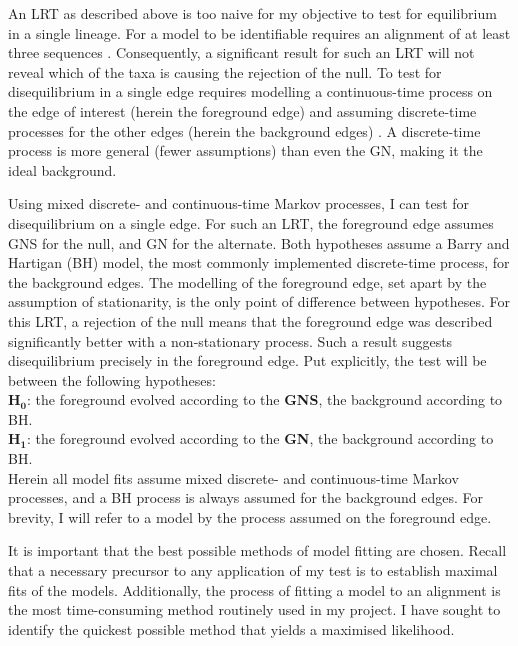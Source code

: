 An LRT as described above is too naive for my objective to test for equilibrium in a single lineage. For a model to be \gls{identifiable} requires an alignment of at least three sequences \cite{Chang1996FullConsistency}. Consequently, a significant result for such an LRT will not reveal which of the taxa is causing the rejection of the null. To test for disequilibrium in a single \gls{edge} requires  modelling a continuous-time process on the edge of interest (herein the foreground edge) and assuming discrete-time processes for the other edges (herein the background edges) \cite{Verbyla2013TheSubstitution}. A discrete-time process is more general (fewer assumptions) than even the GN, making it the ideal background. 

Using mixed discrete- and continuous-time Markov processes, I can test for disequilibrium on a single edge. For such an LRT, the foreground edge assumes GNS for the null, and GN for the alternate. Both hypotheses assume a Barry and Hartigan (BH) model, the most commonly implemented discrete-time process, for the background edges. The modelling of the foreground edge, set apart by the assumption of stationarity, is the only point of difference between hypotheses. For this LRT, a rejection of the null means that the foreground edge was described significantly better with a non-stationary process. Such a result suggests disequilibrium precisely in the foreground edge. Put explicitly, the test will be between the following hypotheses:\\ $\mathbf{H_0}$: the foreground evolved according to the \textbf{GNS}, the background according to BH. \\ $\mathbf{H_1}$: the foreground evolved according to the \textbf{GN}, the background according to BH.\\
\noindent Herein all model fits assume mixed discrete- and continuous-time Markov processes, and a BH process is always assumed for the background edges. For brevity, I will refer to a model by the process assumed on the foreground edge.



It is important that the best possible methods of model fitting are chosen. Recall that a necessary precursor to any application of my test is to establish maximal fits of the models. Additionally, the process of fitting a model to an alignment is the most time-consuming method routinely used in my project. I have sought to identify the quickest possible method that yields a maximised likelihood. 

